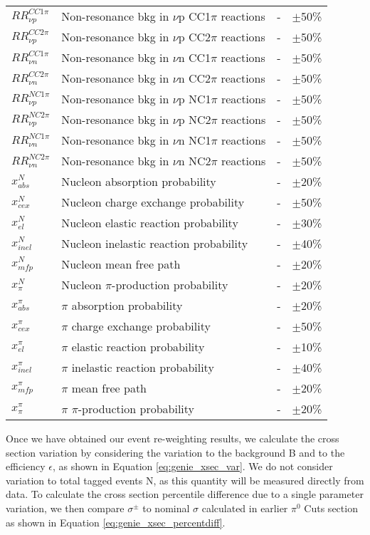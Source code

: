 \begin{table*}
\begin{tabular}{| l | l | l | l |}
$RR_{\nu p}^{CC1\pi}$ & Non-resonance bkg in $\nu$p CC1$\pi$ reactions & - & $\pm$50\% \\ 
$RR_{\nu p}^{CC2\pi}$ & Non-resonance bkg in $\nu$p CC2$\pi$ reactions & - & $\pm$50\% \\ 
$RR_{\nu n}^{CC1\pi}$ & Non-resonance bkg in $\nu$n CC1$\pi$ reactions & - & $\pm$50\% \\ 
$RR_{\nu n}^{CC2\pi}$ & Non-resonance bkg in $\nu$n CC2$\pi$ reactions & - & $\pm$50\% \\ 
$RR_{\nu p}^{NC1\pi}$ & Non-resonance bkg in $\nu$p NC1$\pi$ reactions & - & $\pm$50\% \\ 
$RR_{\nu p}^{NC2\pi}$ & Non-resonance bkg in $\nu$p NC2$\pi$ reactions & - & $\pm$50\% \\ 
$RR_{\nu n}^{NC1\pi}$ & Non-resonance bkg in $\nu$n NC1$\pi$ reactions & - & $\pm$50\% \\ 
$RR_{\nu n}^{NC2\pi}$ & Non-resonance bkg in $\nu$n NC2$\pi$ reactions & - & $\pm$50\% \\  \hline

$x_{abs}^{N}$ & Nucleon absorption probability & - & $\pm$20\% \\ 
$x_{cex}^{N}$ & Nucleon charge exchange probability & - & $\pm$50\% \\ 
$x_{el}^{N}$ & Nucleon elastic reaction probability & - & $\pm$30\% \\ 
$x_{inel}^{N}$ & Nucleon inelastic reaction probability & - & $\pm$40\% \\ 
$x_{mfp}^{N}$ & Nucleon mean free path & - & $\pm$20\% \\
$x_{\pi}^{N}$ & Nucleon $\pi$-production probability & - & $\pm$20\% \\
$x_{abs}^{\pi}$ & $\pi$ absorption probability & - & $\pm$20\% \\
$x_{cex}^{\pi}$ & $\pi$ charge exchange probability & - & $\pm$50\% \\
$x_{el}^{\pi}$ & $\pi$ elastic reaction probability & - & $\pm$10\% \\
$x_{inel}^{\pi}$ & $\pi$ inelastic reaction probability & - & $\pm$40\% \\
$x_{mfp}^{\pi}$ & $\pi$ mean free path & - & $\pm$20\% \\
$x_{\pi}^{\pi}$ & $\pi$ $\pi$-production probability & - & $\pm$20\% \\ \hline
\end{tabular}
\end{table*}

\par Once we have obtained our event re-weighting results, we calculate the cross section variation by considering the variation to the background B and to the efficiency $\epsilon$, as shown in Equation \ref{eq:genie_xsec_var}. We do not consider variation to total tagged events N, as this quantity will be measured directly from data.  To calculate the cross section percentile difference due to a single parameter variation, we then compare $\sigma^\pm$ to nominal $\sigma$ calculated in earlier $\pi^0$ Cuts section as shown in Equation \ref{eq:genie_xsec_percentdiff}.

